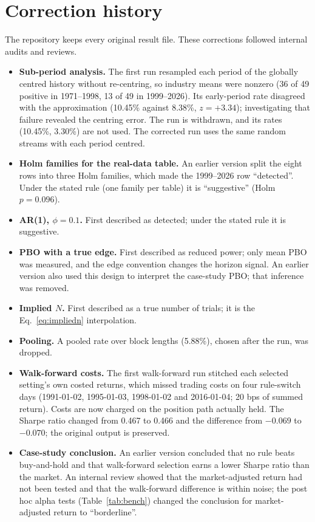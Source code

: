 \documentclass[11pt,a4paper]{article}
\begin{document}
\FloatBarrier
\section{Correction history}\label{app:corrections}

The repository keeps every original result file. These corrections followed internal audits and reviews.
\begin{itemize}
\item \textbf{Sub-period analysis.} The first run resampled each period of the globally centred history without re-centring, so industry means were nonzero (36 of 49 positive in 1971--1998, 13 of 49 in 1999--2026). Its early-period rate disagreed with the approximation (10.45\% against 8.38\%, $z=+3.34$); investigating that failure revealed the centring error. The run is withdrawn, and its rates (10.45\%, 3.30\%) are not used. The corrected run uses the same random streams with each period centred.
\item \textbf{Holm families for the real-data table.} An earlier version split the eight rows into three Holm families, which made the 1999--2026 row ``detected''. Under the stated rule (one family per table) it is ``suggestive'' (Holm $p=0.096$).
\item \textbf{AR(1), $\phi=0.1$.} First described as detected; under the stated rule it is suggestive.
\item \textbf{PBO with a true edge.} First described as reduced power; only mean PBO was measured, and the edge convention changes the horizon signal. An earlier version also used this design to interpret the case-study PBO; that inference was removed.
\item \textbf{Implied $N$.} First described as a true number of trials; it is the Eq.~\eqref{eq:impliedn} interpolation.
\item \textbf{Pooling.} A pooled rate over block lengths (5.88\%), chosen after the run, was dropped.
\item \textbf{Walk-forward costs.} The first walk-forward run stitched each selected setting's own costed returns, which missed trading costs on four rule-switch days (1991-01-02, 1995-01-03, 1998-01-02 and 2016-01-04; 20 bps of summed return). Costs are now charged on the position path actually held. The Sharpe ratio changed from 0.467 to 0.466 and the difference from $-0.069$ to $-0.070$; the original output is preserved.
\item \textbf{Case-study conclusion.} An earlier version concluded that no rule beats buy-and-hold and that walk-forward selection earns a lower Sharpe ratio than the market. An internal review showed that the market-adjusted return had not been tested and that the walk-forward difference is within noise; the post hoc alpha tests (Table~\ref{tab:bench}) changed the conclusion for market-adjusted return to ``borderline''.

\end{itemize}
\end{document}
